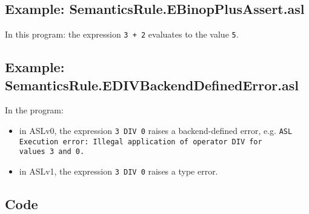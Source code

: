 \documentclass{book}
\begin{document}
  \subsection{Example: SemanticsRule.EBinopPlusAssert.asl}
    In this program:
    the expression \texttt{3 + 2} evaluates to the value \texttt{5}.

  \subsection{Example: \\ SemanticsRule.EDIVBackendDefinedError.asl}
    In the program:
    \begin{itemize}
    \item in ASLv0, the expression \texttt{3 DIV 0} raises a backend-defined
      error, e.g.
      \texttt{ASL Execution error: Illegal application of operator DIV for \\ values 3 and 0.}
    \item in ASLv1, the expression \texttt{3 DIV 0} raises a type error.
    \end{itemize}

  \subsection{Code}
\end{document}

